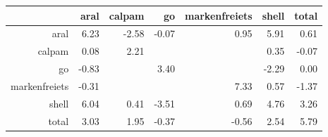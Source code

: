 \begin{table}[ht]
\centering
\begin{tabular}{rrrrrrr}
  \hline
 & aral & calpam & go & markenfreiets & shell & total \\ 
  \hline
aral & 6.23 & -2.58 & -0.07 & 0.95 & 5.91 & 0.61 \\ 
  calpam & 0.08 & 2.21 &  &  & 0.35 & -0.07 \\ 
  go & -0.83 &  & 3.40 &  & -2.29 & 0.00 \\ 
  markenfreiets & -0.31 &  &  & 7.33 & 0.57 & -1.37 \\ 
  shell & 6.04 & 0.41 & -3.51 & 0.69 & 4.76 & 3.26 \\ 
  total & 3.03 & 1.95 & -0.37 & -0.56 & 2.54 & 5.79 \\ 
   \hline
\end{tabular}
\end{table}

